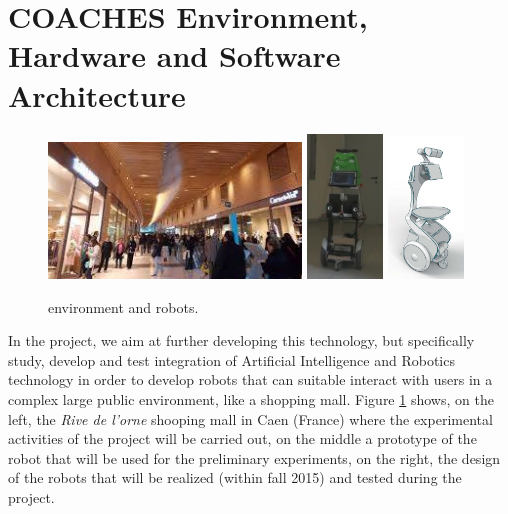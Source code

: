 \section{COACHES Environment, Hardware and Software Architecture}


\begin{figure}[t!]
\centering
\includegraphics[width=0.6\textwidth]{fig/rivedelorne}
\hspace{0.1cm}
\includegraphics[width=0.18\textwidth]{fig/diago1}
\includegraphics[width=0.18\textwidth]{fig/coaches_robot}
\caption{\coaches environment and robots.}
\label{fig:env}
\end{figure}

In the \coaches project, we aim at further developing this technology, but specifically study, develop and test integration of Artificial Intelligence and Robotics technology in order to develop robots that can suitable interact with users in a complex large public environment, like a shopping mall.
Figure \ref{fig:env} shows, on the left, the \emph{Rive de l'orne} shooping mall in Caen (France) where the experimental activities of the project will be carried out, on the middle a prototype of the robot that will be used for the preliminary experiments, on the right, the design of the robots that will be realized (within fall 2015) and tested during the project.


